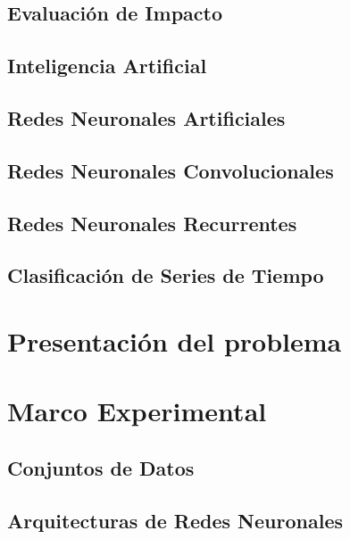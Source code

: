 \documentclass[a4paper,12pt,spanish]{book}
\begin{document}
\section{Evaluación de Impacto}


\section{Inteligencia Artificial}


\section{Redes Neuronales Artificiales}



\section{Redes Neuronales Convolucionales}


\section{Redes Neuronales Recurrentes}


\section{Clasificación de Series de Tiempo}



\chapter{Presentación del problema}



\chapter{Marco Experimental}

\section{Conjuntos de Datos}


\section{Arquitecturas de Redes Neuronales}

\end{document}
